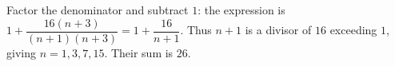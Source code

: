 Factor the denominator and subtract $1$: the expression is $1+\dfrac{16(n+3)}{(n+1)(n+3)}=1+\dfrac{16}{n+1}$. Thus $n+1$ is a divisor of $16$ exceeding $1$, giving $n=1,3,7,15$. Their sum is $\boxed{26}$.
